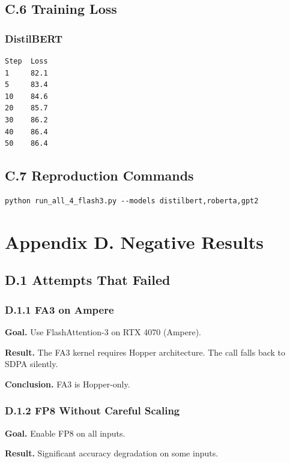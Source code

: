 \subsection{C.6 Training Loss}

\subsubsection{DistilBERT}
\begin{lstlisting}
Step  Loss
1     82.1
5     83.4
10    84.6
20    85.7
30    86.2
40    86.4
50    86.4
\end{lstlisting}

\subsection{C.7 Reproduction Commands}

\begin{lstlisting}
python run_all_4_flash3.py --models distilbert,roberta,gpt2
\end{lstlisting}



\section{Appendix D. Negative Results}

\subsection{D.1 Attempts That Failed}

\subsubsection{D.1.1 FA3 on Ampere}

\textbf{Goal.} Use FlashAttention-3 on RTX 4070 (Ampere).

\textbf{Result.} The FA3 kernel requires Hopper architecture. The call falls 
back to SDPA silently.

\textbf{Conclusion.} FA3 is Hopper-only.

\subsubsection{D.1.2 FP8 Without Careful Scaling}

\textbf{Goal.} Enable FP8 on all inputs.

\textbf{Result.} Significant accuracy degradation on some inputs.

